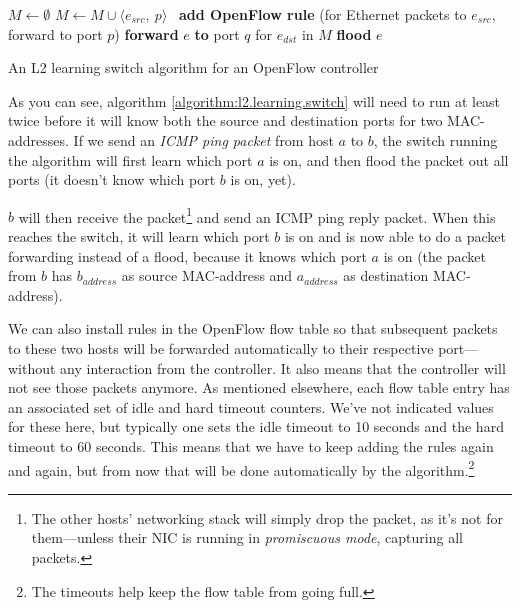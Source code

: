\begin{algorithm}
  \begin{algorithmic}
    \State $M \gets \emptyset$
    \State
      \State $M \gets M \cup \langle e_{src},\ p \rangle$ 
      \State
      \State \textbf{add OpenFlow rule }(for Ethernet packets to
        $e_{src}$, forward to port $p$)
      \State
        \State \textbf{forward} $e$ \textbf{to} port $q$ for $e_{dst}$ in $M$
      \Else
        \State \textbf{flood} $e$ 
      \EndIf
    \EndOn
  \end{algorithmic}
  \caption{An L2 learning switch algorithm for an OpenFlow controller}
  \label{algorithm:l2.learning.switch}
\end{algorithm}

As you can see, algorithm \ref{algorithm:l2.learning.switch} will need to
run at least twice before it will know both the source and destination ports
for two MAC-addresses.  If we send an \textit{\acs{ICMP} ping
packet} from host $a$ to $b$, the switch running the algorithm
will first learn which port $a$ is on, and then flood the packet out all
ports (it doesn't know which port $b$ is on, yet).

$b$ will then receive the packet\footnote{The other hosts' networking stack
will simply drop the packet, as it's not for them---unless their \acs{NIC}
is running in \textit{promiscuous mode}, capturing
all packets.} and send an \acs{ICMP} ping reply packet.  When this
reaches the switch, it will learn which port $b$ is on and is now able
to do a packet forwarding instead of a flood, because it knows which
port $a$ is on (the packet from $b$ has $b_{address}$ as source
MAC-address and $a_{address}$ as destination MAC-address).

We can also install rules in the OpenFlow flow table so that
subsequent packets to these two hosts will be forwarded automatically to
their respective port---without any interaction from the controller.  It
also means that the controller will not see those packets anymore.  As
mentioned elsewhere, each flow table entry has an associated set of idle and
hard timeout counters.  We've not indicated values for these here, but
typically one sets the idle timeout to 10 seconds and the
hard timeout to 60
seconds.  This means that we have to keep adding the rules again and again,
but from now that will be done automatically by the algorithm.\footnote{The
timeouts help keep the flow table from going full.}

